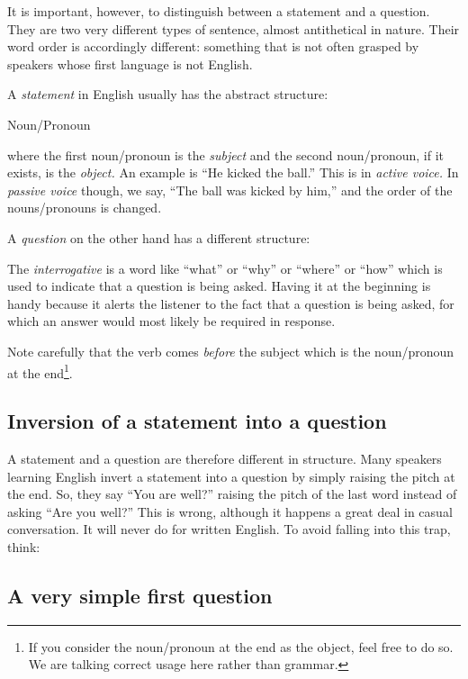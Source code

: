 \documentclass[
  12pt,
  a4paper,
]{article}
\begin{document}
It is important, however, to distinguish between a statement and a
question. They are two very different types of sentence, almost
antithetical in nature. Their word order is accordingly different:
something that is not often grasped by speakers whose first language is
not English.

A \emph{statement} in English usually has the abstract structure:

\begin{ttfamily}
\textcolor{noun}{Noun}/\textcolor{pronoun}{Pronoun}
\end{ttfamily}

where the first noun/pronoun is the \emph{subject} and the second
noun/pronoun, if it exists, is the \emph{object.} An example is ``He
kicked the ball.'' This is in \emph{active voice.} In \emph{passive
voice} though, we say, ``The ball was kicked by him,'' and the order of
the nouns/pronouns is changed.

A \emph{question} on the other hand has a different structure:

The \emph{interrogative} is a word like ``what'' or ``why'' or ``where''
or ``how'' which is used to indicate that a question is being asked.
Having it at the beginning is handy because it alerts the listener to
the fact that a question is being asked, for which an answer would most
likely be required in response.

Note carefully that the verb comes \emph{before} the subject which is
the noun/pronoun at the end\footnote{If you consider the noun/pronoun at
  the end as the object, feel free to do so. We are talking correct
  usage here rather than grammar.}.

\hypertarget{inversion-of-a-statement-into-a-question}{%
\subsection{Inversion of a statement into a
question}\label{inversion-of-a-statement-into-a-question}}

A statement and a question are therefore different in structure. Many
speakers learning English invert a statement into a question by simply
raising the pitch at the end. So, they say ``You are well?'' raising the
pitch of the last word instead of asking ``Are you well?'' This is
wrong, although it happens a great deal in casual conversation. It will
never do for written English. To avoid falling into this trap, think:

\hypertarget{a-very-simple-first-question}{%
\subsection{A very simple first
question}\label{a-very-simple-first-question}}
\end{document}

